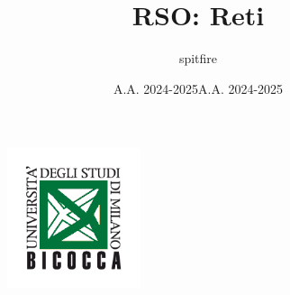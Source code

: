 \documentclass[12pt]{article}
\title{RSO: Reti}
\author{spitfire}
\date{A.A. 2024-2025}
\begin{document}
\begin{figure}
    \centering
    \includegraphics[width=0.35\textwidth]{Images/Logo scienze bicocca.png}
\end{figure}

\vspace{10cm}
\date{A.A. 2024-2025}


\maketitle

\newpage

\tableofcontents
\newpage
\end{document}
